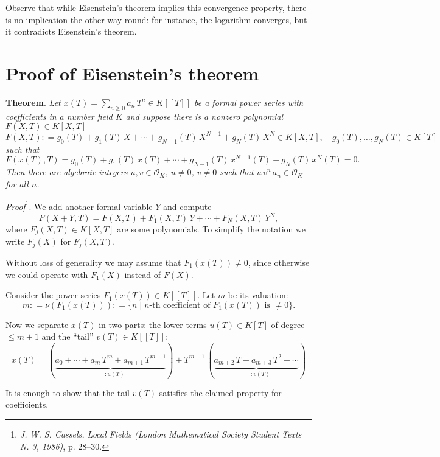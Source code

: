 \documentclass{article}
\newcommand{\dfn}{\mathrel{\mathop:}=}
\newcommand{\rdfn}{=\mathrel{\mathop:}}
\theoremstyle{myplain}
\theoremstyle{mydefinition}
\begin{document}
Observe that while Eisenstein's theorem implies this convergence property,
there is no implication the other way round: for instance, the logarithm
converges, but it contradicts Eisenstein's theorem.

\section{Proof of Eisenstein's theorem}

\noindent\textbf{Theorem}. \emph{Let
  $x (T) = \sum\limits_{n \ge 0} a_n\,T^n \in K [\![T]\!]$ be a formal power
  series with coefficients in a number field $K$ and suppose there is a nonzero
  polynomial $F (X,T) \in K [X,T]$}
\[ F (X,T) \dfn g_0 (T) + g_1 (T) \, X + \cdots + g_{N-1} (T) \, X^{N-1} + g_N (T) \, X^N \in K [X,T], \quad
  g_0 (T), \ldots, g_N (T) \in K [T] \]
\emph{such that}
\[ \tag{1} F (x(T),T) = g_0 (T) + g_1 (T) \, x (T) + \cdots + g_{N-1} (T) \, x^{N-1} (T) + g_N (T) \, x^N (T) = 0. \]
\emph{Then there are algebraic integers $u,v \in \mathcal{O}_K$, $u \ne 0$, $v \ne 0$
  such that $u \, v^n \, a_n \in \mathcal{O}_K$ for all $n$.}

\vspace{1em}

\noindent\emph{Proof}\footnote{\emph{J. W. S. Cassels, Local Fields (London Mathematical Society Student Texts N. 3, 1986)}, p. 28--30.}.
We add another formal variable $Y$ and compute
\[ \tag{2} F (X + Y, T) = F (X,T) + F_1 (X,T)\,Y + \cdots + F_N (X,T)\,Y^N, \]
where $F_j (X,T) \in K [X,T]$ are some polynomials. To simplify the
notation we write $F_j (X)$ for $F_j (X,T)$.

Without loss of generality we may assume that $F_1 (x(T)) \ne 0$, since
otherwise we could operate with $F_1 (X)$ instead of $F (X)$.

Consider the power series $F_1 (x(T)) \in K [\![T]\!]$. Let $m$ be its
valuation:
\[ m \dfn \nu (F_1 (x(T))) \dfn \{ n \mid n\text{-th coefficient of }F_1 (x(T))\text{ is } \ne 0 \}. \]

Now we separate $x (T)$ in two parts: the lower terms $u (T) \in K [T]$ of
degree $\le m+1$ and the ``tail'' $v (T) \in K [\![T]\!]$:
\[ \tag{3} x(T) = (\underbrace{a_0 + \cdots + a_m\,T^m + a_{m+1}\,T^{m+1}}_{\rdfn u (T)}) +
  T^{m+1}\,(\underbrace{a_{m+2}\,T + a_{m+3}\,T^2 + \cdots}_{\rdfn v(T)}) \]

It is enough to show that the tail $v (T)$ satisfies the claimed property for
coefficients.

\vspace{1em}
\end{document}
